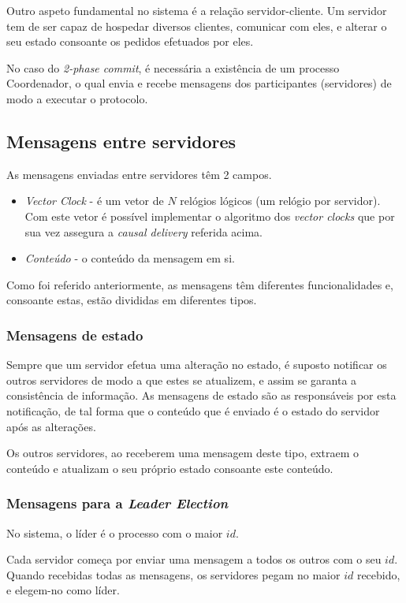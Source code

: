 \documentclass[12pt, a4paper]{report}
\begin{document}
Outro aspeto fundamental no sistema é a relação servidor-cliente. 
Um servidor tem de ser capaz de hospedar diversos clientes, comunicar com eles, e alterar o seu estado consoante os pedidos efetuados por eles.

No caso do \textit{2-phase commit}, é necessária a existência de um processo Coordenador, o qual envia e recebe mensagens dos participantes (servidores) de modo a executar o protocolo.

\subsection{Mensagens entre servidores}
As mensagens enviadas entre servidores têm 2 campos.
\begin{itemize}
    \item \textit{Vector Clock} - é um vetor de $N$ relógios lógicos (um relógio por servidor). Com este vetor é possível implementar o algoritmo dos \textit{vector clocks} que por sua vez assegura a \textit{causal delivery} referida acima.
    \item \textit{Conteúdo} - o conteúdo da mensagem em si.
\end{itemize}

Como foi referido anteriormente, as mensagens têm diferentes funcionalidades e, consoante estas, estão divididas em diferentes tipos.

\subsubsection{Mensagens de estado}
Sempre que um servidor efetua uma alteração no estado, é suposto notificar os outros servidores de modo a que estes se atualizem, e assim se garanta a consistência de informação.
As mensagens de estado são as responsáveis por esta notificação, de tal forma que o conteúdo que é enviado é o estado do servidor após as alterações.

Os outros servidores, ao receberem uma mensagem deste tipo, extraem o conteúdo e atualizam o seu próprio estado consoante este conteúdo.


\subsubsection{Mensagens para a \textit{Leader Election}}
No sistema, o líder é o processo com o maior $id$.

Cada servidor começa por enviar uma mensagem a todos os outros com o seu $id$.
Quando recebidas todas as mensagens, os servidores pegam no maior $id$ recebido, e elegem-no como líder.
\end{document}
